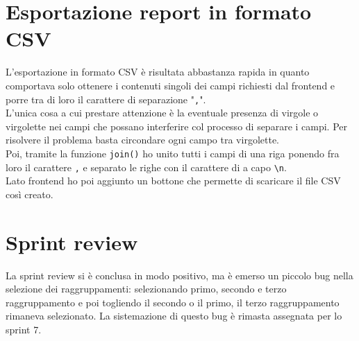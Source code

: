 \section{Esportazione report in formato CSV}
L'esportazione in formato CSV è risultata abbastanza rapida in quanto comportava solo ottenere i contenuti singoli dei campi richiesti dal frontend e porre tra di loro il carattere di separazione "\texttt{,}".\\
L'unica cosa a cui prestare attenzione è la eventuale presenza di virgole o virgolette nei campi che possano interferire col processo di separare i campi.
Per risolvere il problema basta circondare ogni campo tra virgolette.\\
Poi, tramite la funzione \texttt{join()} ho unito tutti i campi di una riga ponendo fra loro il carattere \texttt{,} e separato le righe con il carattere di a capo \texttt{\textbackslash n}.\\
Lato frontend ho poi aggiunto un bottone che permette di scaricare il file CSV così creato.

\section{Sprint review}
La sprint review si è conclusa in modo positivo, ma è emerso un piccolo bug nella selezione dei raggruppamenti: selezionando primo, secondo e terzo raggruppamento e poi togliendo il secondo o il primo, il terzo raggruppamento rimaneva selezionato. La sistemazione di questo bug è rimasta assegnata per lo sprint 7.